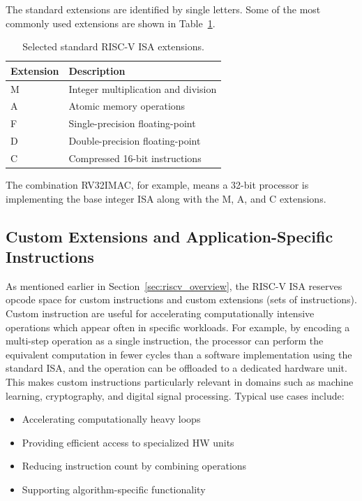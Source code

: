 The standard extensions are identified by single letters. Some of the most commonly used extensions are shown in Table~\ref{tab:riscv_extensions}.

\begin{table}[H]
\centering
\caption{Selected standard RISC-V ISA extensions.}
\label{tab:riscv_extensions}
\begin{tabular}{ll}
\hline
\textbf{Extension} & \textbf{Description} \\
\hline
M & Integer multiplication and division \\
A & Atomic memory operations \\
F & Single-precision floating-point \\
D & Double-precision floating-point \\
C & Compressed 16-bit instructions \\
\hline
\end{tabular}
\end{table}

The combination RV32IMAC, for example, means a 32-bit processor is implementing the base integer ISA along with the M, A, and C extensions. 


\subsection{Custom Extensions and Application-Specific Instructions}
\label{sec:riscv_custom}

As mentioned earlier in Section~\ref{sec:riscv_overview}, the RISC-V ISA reserves opcode space for custom instructions and custom extensions (sets of instructions). Custom instruction are useful for accelerating computationally intensive operations which appear often in specific workloads. For example, by encoding a multi-step operation as a single instruction, the processor can perform the equivalent computation in fewer cycles than a software implementation using the standard ISA, and the operation can be offloaded to a dedicated hardware unit. This makes custom instructions particularly relevant in domains such as machine learning, cryptography, and digital signal processing. Typical use cases include:

\begin{itemize}
    \item Accelerating computationally heavy loops
    \item Providing efficient access to specialized HW units
    \item Reducing instruction count by combining operations
    \item Supporting algorithm-specific functionality
\end{itemize}

